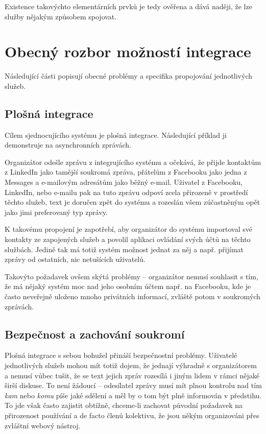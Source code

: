 \documentclass[12pt,oneside,final]{fithesis2}
\begin{document}
Existence takovýchto elementárních prvků je tedy ověřena a dává naději, že lze služby nějakým způsobem spojovat.


\section{Obecný rozbor možností integrace}
Následující části popisují obecné problémy a specifika propojování jednotlivých služeb.

\subsection{Plošná integrace}
Cílem sjednocujícího systému je plošná integrace. Následující příklad ji demonstruje na asynchronních zprávách.

Organizátor odešle zprávu z integrujícího systému a očekává, že přijde kontaktům z LinkedIn jako tamější soukromá zpráva, přátelům z Facebooku jako jedna z Messages a e-mailovým adresátům jako běžný e-mail. Uživatel z Facebooku, LinkedIn, nebo e-mailu pak na tuto zprávu odpoví zcela přirozeně v prostředí těchto služeb, text je doručen zpět do systému a rozeslán všem zúčastněným opět jako jimi preferovaný typ zprávy.

K takovému propojení je zapotřebí, aby organizátor do systému importoval své kontakty ze zapojených služeb a povolil aplikaci ovládání svých účtů na těchto službách. Jedině tak má totiž systém možnost jednat za něj a např. přijímat zprávy od ostatních, nic netušících uživatelů.

Takovýto požadavek ovšem skýtá problémy -- organizátor nemusí souhlasit s tím, že má nějaký systém moc nad jeho osobním účtem např. na Facebooku, kde je často neveřejně uloženo mnoho privátních informací, zvláště potom v soukromých zprávách.

\subsection{Bezpečnost a zachování soukromí}\label{security}
Plošná integrace s sebou bohužel přináší bezpečnostní problémy. Uživatelé jednotlivých služeb mohou mít totiž dojem, že jednají výhradně s organizátorem a nemusí vůbec tušit, že se text jejich zpráv rozesílá i jiným lidem v rámci nějaké širší diskuse. To není žádoucí -- odesílatel zprávy musí mít plnou kontrolu nad tím \emph{kam} nebo \emph{komu} píše jaké sdělení a měl by o tom být plně informován v předstihu. To jde však často zajistit obtížně, chceme-li zachovat původní požadavek na přirozenost používání a de facto  členů kolektivu, že jsou někým organizováni přes zvláštní webový nástroj.
\end{document}
